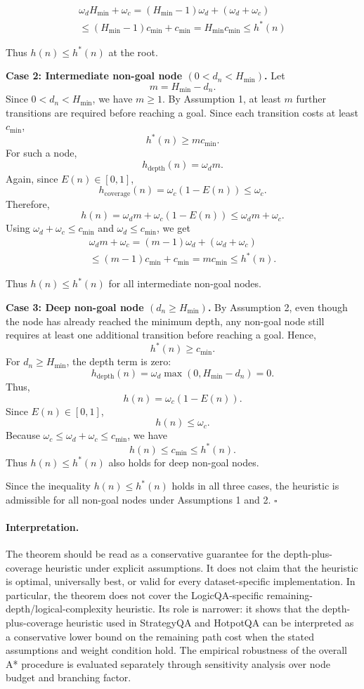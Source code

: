 \documentclass[11pt]{article}
\begin{document}
{\begin{multline}
    \omega_d H_{\min} + \omega_c
= (H_{\min}-1)\omega_d + (\omega_d+\omega_c) \\
\leq (H_{\min}-1)c_{\min}+c_{\min}
= H_{\min}c_{\min}
\leq h^*(n)
\end{multline}


Thus \(h(n)\leq h^*(n)\) at the root.

\textbf{Case 2: Intermediate non-goal node \((0<d_n<H_{\min})\).}
Let
\[
m = H_{\min}-d_n.
\]
Since \(0<d_n<H_{\min}\), we have \(m\geq 1\). By Assumption 1, at least \(m\) further transitions are required before reaching a goal. Since each transition costs at least \(c_{\min}\),
\[
h^*(n) \geq m c_{\min}.
\]
For such a node,
\[
h_{\mathrm{depth}}(n)=\omega_d m.
\]
Again, since \(E(n)\in[0,1]\),
\[
h_{\mathrm{coverage}}(n)=\omega_c(1-E(n))\leq \omega_c.
\]
Therefore,
\[
h(n)=\omega_d m+\omega_c(1-E(n))
\leq \omega_d m+\omega_c.
\]
Using \(\omega_d+\omega_c\leq c_{\min}\) and \(\omega_d\leq c_{\min}\), we get
\begin{multline}
    \omega_d m+\omega_c
= (m-1)\omega_d+(\omega_d+\omega_c) \\
\leq (m-1)c_{\min}+c_{\min}
= m c_{\min}
\leq h^*(n).
\end{multline}


Thus \(h(n)\leq h^*(n)\) for all intermediate non-goal nodes.

\textbf{Case 3: Deep non-goal node \((d_n\geq H_{\min})\).}
By Assumption 2, even though the node has already reached the minimum depth, any non-goal node still requires at least one additional transition before reaching a goal. Hence,
\[
h^*(n)\geq c_{\min}.
\]
For \(d_n\geq H_{\min}\), the depth term is zero:
\[
h_{\mathrm{depth}}(n)=\omega_d\max(0,H_{\min}-d_n)=0.
\]
Thus,
\[
h(n)=\omega_c(1-E(n)).
\]
Since \(E(n)\in[0,1]\),
\[
h(n)\leq \omega_c.
\]
Because \(\omega_c\leq \omega_d+\omega_c\leq c_{\min}\), we have
\[
h(n)\leq c_{\min}\leq h^*(n).
\]
Thus \(h(n)\leq h^*(n)\) also holds for deep non-goal nodes.

Since the inequality \(h(n)\leq h^*(n)\) holds in all three cases, the heuristic is admissible for all non-goal nodes under Assumptions 1 and 2.
\(\square\)

\paragraph{Interpretation.}
The theorem should be read as a conservative guarantee for the depth-plus-coverage heuristic under explicit assumptions. It does not claim that the heuristic is optimal, universally best, or valid for every dataset-specific implementation. In particular, the theorem does not cover the LogicQA-specific remaining-depth/logical-complexity heuristic. Its role is narrower: it shows that the depth-plus-coverage heuristic used in StrategyQA and HotpotQA can be interpreted as a conservative lower bound on the remaining path cost when the stated assumptions and weight condition hold. The empirical robustness of the overall A* procedure is evaluated separately through sensitivity analysis over node budget and branching factor.



}
\end{document}
